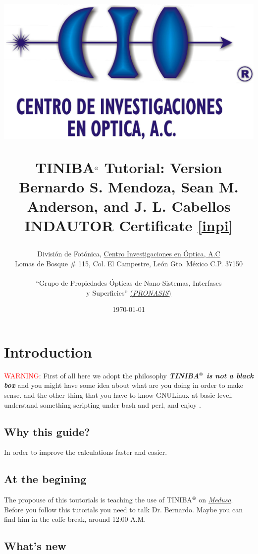 \documentclass[12pt]{article}
\title{
\vspace{-50pt}
\begin{center}
\includegraphics[scale=0.5]{logo-cio-nuevo.jpg}  
\vspace{10pt}
\end{center}
\vspace{12pt}
\Large{\textbf{TINIBA${\reg}$ Tutorial: Version \ver} \\
Bernardo S. Mendoza, Sean M. Anderson, and J. L. Cabellos}\\
INDAUTOR Certificate \ref{inpi} 
}
\author{{Divisi\'on de Fot\'onica, \href{http://www.cio.mx}{Centro
      Investigaciones en \'Optica, A.C }}\\
\small{Lomas de Bosque \# 115, Col. El Campestre, Le\'on Gto. M\'exico C.P. 37150}\\ 
\date{\today }
``Grupo de Propiedades \'Opticas de Nano-Sistemas, Interfases\\ y 
Superficies''
\href{http://aida.cio.mx}{(\emph{PRONASIS})} \\   
}
\numberwithin{equation}{section}
\begin{document}
\maketitle
\tableofcontents


\newpage
\section{Introduction}

\textcolor{red}{WARNING}: 
First of all here we adopt the philosophy \emph{{\bf{TINIBA$\reg$ is
      not a black box}}} 
and you might have some idea about what are you doing in order to make sense.
and the other thing that you have to know GNU\/Linux at basic level, 
understand something  scripting under bash and perl, 
and enjoy \tiniba.   
  
\subsection{Why this guide?}
In order to improve the calculations faster and easier. 


\subsection{At the begining}
The propouse of this toutorials is teaching the use of TINIBA$\reg$ 
on \href{http://aida.cio.mx/medusaPhotos/medusaPhoto2.jpg} {\emph{Medusa}}.\\ 
Before you follow this tutorials you need to talk  Dr. Bernardo.  
Maybe you can find him in the coffe break, around 12:00 A.M.

\subsection{What's new}
\end{document}
